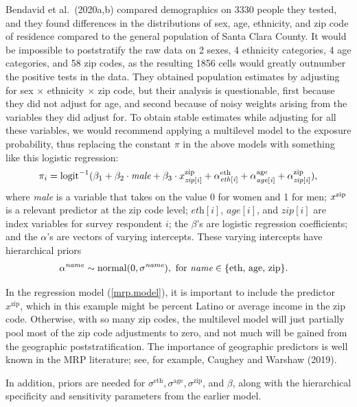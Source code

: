 \documentclass[11pt]{article}
\begin{document}
Bendavid et al.\ (2020a,b) compared demographics on 3330 people they
tested, and they found differences in the distributions of sex, age,
ethnicity, and zip code of residence compared to the general
population of Santa Clara County. It would be impossible to
poststratify the raw data on 2 sexes, 4 ethnicity categories, 4 age
categories, and 58 zip codes, as the resulting 1856 cells would
greatly outnumber the positive tests in the data.  They obtained
population estimates by adjusting for sex $\times$ ethnicity $\times$
zip code, but their analysis is questionable, first because they did
not adjust for age, and second because of noisy weights arising from
the variables they did adjust for.  To obtain stable estimates while
adjusting for all these variables, we would recommend applying a
multilevel model to the exposure probability, thus replacing the
constant $\pi$ in the above models with something like this logistic
regression:
%
\begin{equation}\label{mrp.model}
\pi_i = \mbox{logit}^{-1}(\beta_1 + \beta_2 \cdot \mbox{\it male} + \beta_3 \cdot x^{\textrm{zip}}_{\it zip[i]} + \alpha^{\textrm{eth}}_{\it eth[i]} + \alpha^{\textrm{age}}_{\it age[i]} + \alpha^{\textrm{zip}}_{\it zip[i]}),
\end{equation}
%
where {\it male} is a variable that takes on the value 0 for women and
1 for men; $x^{\rm zip}$ is a relevant predictor at the zip code
level; $\textit{eth}[i]$, $\textit{age}[i]$, and $\textit{zip}[i]$ are
index variables for survey respondent $i$; the $\beta$'s are logistic
regression coefficients; and the $\alpha$'s are vectors of varying
intercepts.  These varying intercepts have hierarchical priors
%
\begin{align*}
  \alpha^{\it name} &\sim \mbox{normal}(0, \sigma^{\textit{name}}), \ \textrm{for} \ \textit{name} \in \{ \textrm{eth, age, zip} \}.
\end{align*}
%

In the regression model (\ref{mrp.model}), it is important to include
the predictor $x^{\textrm{zip}}$, which in this example might be
percent Latino or average income in the zip code.  Otherwise, with so
many zip codes, the multilevel model will just partially pool most of
the zip code adjustments to zero, and not much will be gained from the
geographic poststratification.  The importance of geographic
predictors is well known in the MRP literature; see, for example,
Caughey and Warshaw (2019).

In addition, priors are needed for
$\sigma^{\textrm{eth}}, \sigma^{\textrm{age}}, \sigma^{\textrm{zip}}$,
and $\beta$, along with the hierarchical specificity and sensitivity
parameters from the earlier model.
\end{document}
